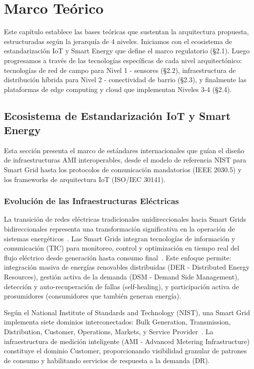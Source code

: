 ﻿\chapter{Marco Teórico}

Este capítulo establece las bases teóricas que sustentan la arquitectura propuesta, estructuradas según la jerarquía de 4 niveles. Iniciamos con el ecosistema de estandarización IoT y Smart Energy que define el marco regulatorio (§2.1). Luego progresamos a través de las tecnologías específicas de cada nivel arquitectónico: tecnologías de red de campo para Nivel 1 - sensores (§2.2), infraestructura de distribución híbrida para Nivel 2 - conectividad de barrio (§2.3), y finalmente las plataformas de edge computing y cloud que implementan Niveles 3-4 (§2.4).

\section{Ecosistema de Estandarización IoT y Smart Energy}

Esta sección presenta el marco de estándares internacionales que guían el diseño de infraestructuras AMI interoperables, desde el modelo de referencia NIST para Smart Grid hasta los protocolos de comunicación mandatorios (IEEE 2030.5) y los frameworks de arquitectura IoT (ISO/IEC 30141).

\subsection{Evolución de las Infraestructuras Eléctricas}

La transición de redes eléctricas tradicionales unidireccionales hacia Smart Grids bidireccionales representa una transformación significativa en la operación de sistemas energéticos~\cite{velasquezSmartGridsEmpowered2024,alsafranChallengesImplementingIoT2025}. Las Smart Grids integran tecnologías de información y comunicación (TIC) para monitoreo, control y optimización en tiempo real del flujo eléctrico desde generación hasta consumo final~\cite{SmartHomeEnergy2024}. Este enfoque permite: integración masiva de energías renovables distribuidas (DER - Distributed Energy Resources), gestión activa de la demanda (DSM - Demand Side Management), detección y auto-recuperación de fallas (self-healing), y participación activa de prosumidores (consumidores que también generan energía).

Según el National Institute of Standards and Technology (NIST), una Smart Grid implementa siete dominios interconectados: Bulk Generation, Transmission, Distribution, Customer, Operations, Markets, y Service Provider~\cite{NISTFramework2022,IEEERecommendedPractice}. La infraestructura de medición inteligente (AMI - Advanced Metering Infrastructure) constituye el dominio Customer, proporcionando visibilidad granular de patrones de consumo y habilitando servicios de respuesta a la demanda (DR).


